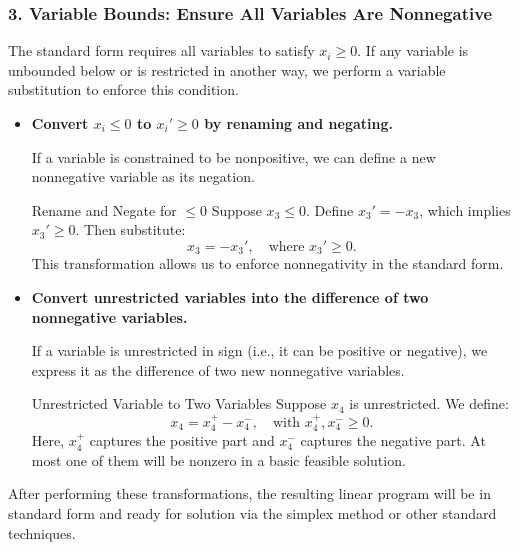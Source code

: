 \subsubsection*{3. Variable Bounds: Ensure All Variables Are Nonnegative}

The standard form requires all variables to satisfy \( x_i \geq 0 \). If any variable is unbounded below or is restricted in another way, we perform a variable substitution to enforce this condition.

\begin{itemize}
    \item[(a)] \textbf{Convert \( x_i \leq 0 \) to \( x_i' \geq 0 \) by renaming and negating.}

    If a variable is constrained to be nonpositive, we can define a new nonnegative variable as its negation.

    \begin{example}{Rename and Negate for \(\leq 0\)}
    Suppose \( x_3 \leq 0 \). Define \( x_3' = -x_3 \), which implies \( x_3' \geq 0 \). Then substitute:
    \[
    x_3 = -x_3', \quad \text{where } x_3' \geq 0.
    \]
    This transformation allows us to enforce nonnegativity in the standard form.
    \end{example}

    \item[(b)] \textbf{Convert unrestricted variables into the difference of two nonnegative variables.}

    If a variable is unrestricted in sign (i.e., it can be positive or negative), we express it as the difference of two new nonnegative variables.

    \begin{example}{Unrestricted Variable to Two Variables}
    Suppose \( x_4 \) is unrestricted. We define:
    \[
    x_4 = x_4^+ - x_4^-, \quad \text{with } x_4^+, x_4^- \geq 0.
    \]
    Here, \( x_4^+ \) captures the positive part and \( x_4^- \) captures the negative part. At most one of them will be nonzero in a basic feasible solution.
    \end{example}
\end{itemize}

\medskip

After performing these transformations, the resulting linear program will be in standard form and ready for solution via the simplex method or other standard techniques.


